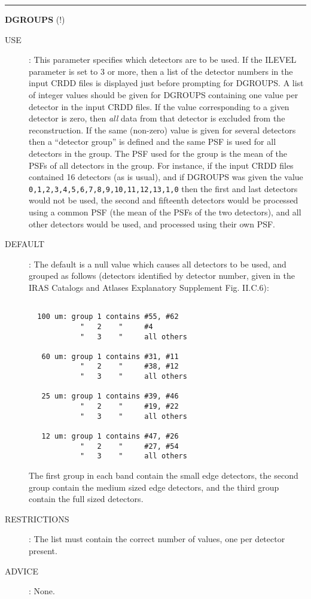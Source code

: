 \rule{\textwidth}{0.3mm}
{\Large {\bf DGROUPS} (!)}
\begin{description}
\item [USE]:
This parameter specifies which detectors are to be used. If the ILEVEL 
parameter is set to 3 or more, then a list of the detector numbers
in the input CRDD files is displayed just before prompting for DGROUPS. A list 
of integer values should be given for DGROUPS containing one value per detector
in the input CRDD files. If the value corresponding to a given detector is zero, 
then {\em all} data from that detector is excluded from the reconstruction. If 
the same (non-zero) value is given for several detectors then a ``detector 
group'' is defined and the same PSF is used for all detectors in the group. 
The PSF used for the group is the mean of the PSFs of all detectors in the 
group. For instance, if the input CRDD files contained 16 detectors (as is 
usual), and if DGROUPS was given the value 
{\tt 0,1,2,3,4,5,6,7,8,9,10,11,12,13,1,0} then the first and last detectors 
would not be used, the second and fifteenth detectors would be processed using 
a common PSF (the mean of the PSFs of the two detectors), and all other 
detectors would be used, and processed using their own PSF.
\item [DEFAULT]:
The default is a null value which causes all detectors to be used, and grouped
as follows (detectors identified by detector number, given in the IRAS 
Catalogs and Atlases Explanatory Supplement Fig. II.C.6):
\begin{verbatim}

  100 um: group 1 contains #55, #62
            "   2    "     #4
            "   3    "     all others

   60 um: group 1 contains #31, #11
            "   2    "     #38, #12
            "   3    "     all others

   25 um: group 1 contains #39, #46
            "   2    "     #19, #22
            "   3    "     all others

   12 um: group 1 contains #47, #26
            "   2    "     #27, #54
            "   3    "     all others

\end{verbatim}
The first group in each band contain the small edge detectors, the second group
contain the medium sized edge detectors, and the third group contain the 
full sized detectors.
\item [RESTRICTIONS]:
The list must contain the correct number of values, one per detector present.
\item [ADVICE]:
None.
\end {description}

